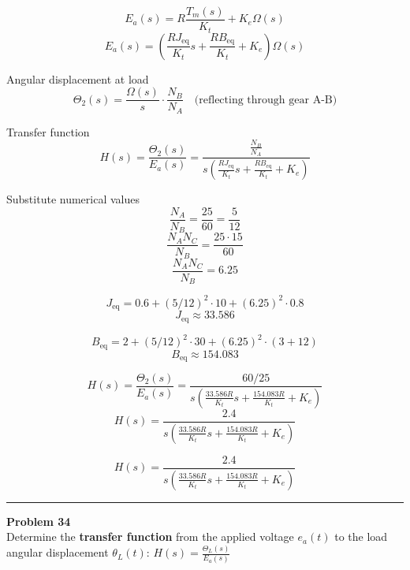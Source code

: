 \[
E_a(s) = R \frac{T_m(s)}{K_t} + K_e \Omega(s) 
\]
\[
E_a(s) = \left( \frac{R J_\text{eq}}{K_t} s + \frac{R B_\text{eq}}{K_t} + K_e \right) \Omega(s)
\]

Angular displacement at load
\[
\Theta_2(s) = \frac{\Omega(s)}{s} \cdot \frac{N_B}{N_A} \quad \text{(reflecting through gear A-B)}
\]

Transfer function
\[
H(s) = \frac{\Theta_2(s)}{E_a(s)} = \frac{\frac{N_B}{N_A}}{s \left( \frac{R J_\text{eq}}{K_t} s + \frac{R B_\text{eq}}{K_t} + K_e \right)}
\]

Substitute numerical values
\[
\frac{N_A}{N_B} = \frac{25}{60} = \frac{5}{12}
\]
\[
\frac{N_A N_C}{N_B} = \frac{25\cdot15}{60} 
\]
\[
\frac{N_A N_C}{N_B}= 6.25
\]

\[
J_\text{eq} = 0.6 + (5/12)^2 \cdot 10 + (6.25)^2 \cdot 0.8 
\]
\[
J_\text{eq} \approx 33.586
\]

\[
B_\text{eq} = 2 + (5/12)^2 \cdot 30 + (6.25)^2 \cdot (3 + 12) 
\]
\[
B_\text{eq} \approx 154.083
\]

\[
H(s) = \frac{\Theta_2(s)}{E_a(s)} = \frac{60/25}{s \left( \frac{33.586 R}{K_t} s + \frac{154.083 R}{K_t} + K_e \right)} 
\]
\[
H(s) = \frac{2.4}{s \left( \frac{33.586 R}{K_t} s + \frac{154.083 R}{K_t} + K_e \right)}
\]

\[
\boxed{
H(s) = \frac{2.4}{s \left( \frac{33.586 R}{K_t} s + \frac{154.083 R}{K_t} + K_e \right)}
}
\]

\newpage

\noindent\rule{\textwidth}{1pt}
\noindent\textbf{Problem 34} \hfill
\\ Determine the \textbf{transfer function} from the applied voltage $e_a(t)$ to the load angular displacement $\theta_L(t)$: $H(s) = \frac{\Theta_L(s)}{E_a(s)}$

